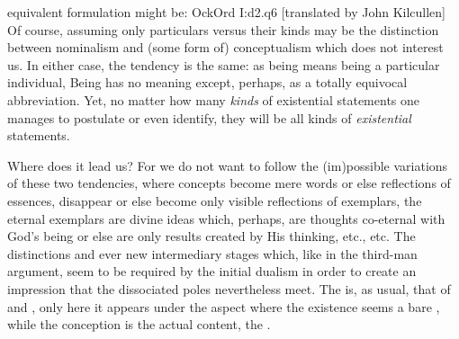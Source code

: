 equivalent formulation might be: \citet{[b]ecause singularity immediately befits
  that to which it belongs, therefore it cannot befit it through something else;
  therefore if something is singular, it is singular by itself.}{OckOrd}{
  I:d2.q6  [translated by John Kilcullen]\label{ftnt:noPrincInd}}
%
Of course, assuming only particulars versus their kinds may be the
distinction between nominalism and (some form of) conceptualism which does not
interest us. In either case, the tendency is the same: as being means being a
particular individual, Being has no meaning except, perhaps, as a totally
equivocal abbreviation.  Yet, no matter how many {\em kinds} of existential statements
one manages to postulate or even identify, they will be all kinds of {\em
  existential} statements.

\pa Where does it lead us? For we do not want to follow the (im)possible
variations of these two tendencies, where concepts become mere words or else
 reflections of essences,  disappear or else become
only visible reflections of exemplars, the eternal exemplars are divine ideas
which, perhaps, are thoughts co-eternal with God's being or else are only
results created by His thinking, etc., etc. The distinctions and ever new
intermediary stages which, like in the third-man argument, seem to be required
by the initial dualism in order to create an impression that the dissociated
poles nevertheless meet. The  is, as usual, that of 
and , only here it appears under the aspect where the
 existence seems a bare , while the 
conception is the actual content, the .

